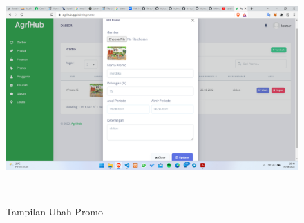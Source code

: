\begin{enumerate}
\begin{enumerate}[a.]
\begin{figure}[H]
			{\includegraphics [width = 13.5cm, height= 8cm]{gambar/admin/ubah_promo}}
			\caption{Tampilan Ubah Promo}
			\label{ubah_promo}
		\end{figure}


\end{enumerate}
\end{enumerate}

